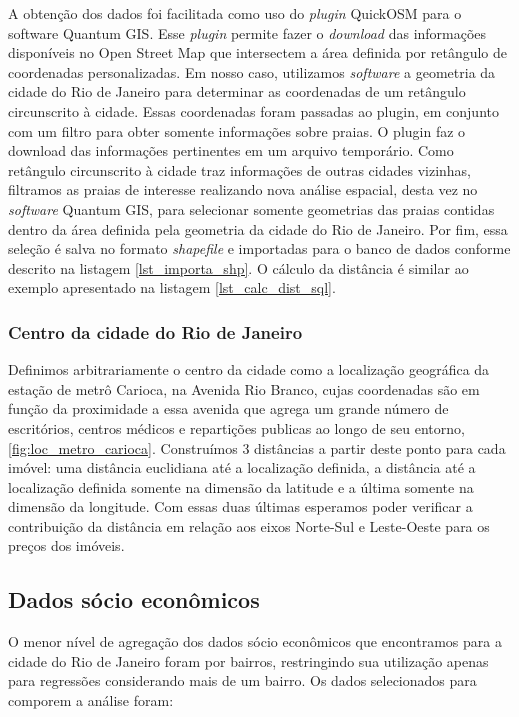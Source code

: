 A obtenção dos dados foi facilitada como uso do \textit{plugin} QuickOSM para o software Quantum GIS. Esse \textit{plugin} permite fazer o \textit{download} das informações disponíveis no Open Street Map que intersectem a área definida por retângulo de coordenadas personalizadas. Em nosso caso, utilizamos \textit{software} a geometria da cidade do Rio de Janeiro para determinar as coordenadas de um retângulo circunscrito à cidade. Essas coordenadas foram passadas ao plugin, em conjunto com um filtro para obter somente informações sobre praias. O plugin faz o  download das informações pertinentes em um arquivo temporário. Como  retângulo circunscrito à cidade traz informações de outras cidades vizinhas, filtramos as praias de interesse realizando nova análise espacial, desta vez no \textit{software} Quantum GIS, para selecionar somente geometrias das praias contidas dentro da área definida pela geometria da cidade do Rio de Janeiro. Por fim, essa seleção é salva no formato \textit{shapefile} e importadas para o banco de dados conforme descrito na listagem \ref{lst_importa_shp}. O cálculo da distância é similar ao exemplo apresentado na listagem \ref{lst_calc_dist_sql}.

\subsubsection{Centro da cidade do Rio de Janeiro}

Definimos arbitrariamente o centro da cidade como a localização geográfica da estação de metrô Carioca, na Avenida Rio Branco, cujas coordenadas são  em função da proximidade a essa avenida que agrega um grande número de escritórios, centros médicos e repartições publicas ao longo de seu entorno, \cref{fig:loc_metro_carioca}. Construímos 3 distâncias a partir deste ponto para cada imóvel: uma distância euclidiana até a localização definida, a distância até a localização definida somente na dimensão da latitude e a última somente na dimensão da longitude. Com essas duas últimas esperamos poder verificar a contribuição da distância em relação aos eixos Norte-Sul e Leste-Oeste para os preços dos imóveis.

\subsection{Dados sócio econômicos}

O menor nível de agregação dos dados sócio econômicos que encontramos para a cidade do Rio de Janeiro foram por bairros, restringindo sua utilização apenas para regressões considerando mais de um bairro. Os dados selecionados para comporem a análise foram:

